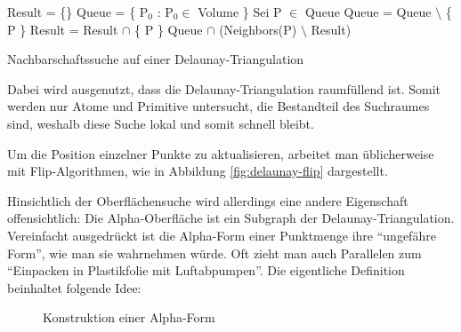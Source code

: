 \begin{algorithm}
  \centering
  \begin{algorithmic}
    \STATE Result = \{\}
    \STATE Queue = \{ P$_0$ : P$_0 \in$ Volume \}
    \STATE Sei P $\in$ Queue
    \STATE Queue = Queue $\setminus$ \{ P \}
    \STATE Result = Result $\cap$ \{ P \}
    \STATE Queue $\cap$ (Neighbors(P) $\setminus$ Result)
    \ENDIF
    \ENDWHILE
  \end{algorithmic}
  \caption[Nachbarschaftssuche auf einer Delaunay-Triangulation]{Nachbarschaftssuche auf einer Delaunay-Triangulation}
  \label{algo:delaunay-neighbors}
\end{algorithm}


Dabei wird ausgenutzt, dass die Delaunay-Triangulation raumfüllend ist.
Somit werden nur Atome und Primitive untersucht, die Bestandteil des Suchraumes sind, weshalb diese Suche lokal und somit schnell bleibt.

Um die Position einzelner Punkte zu aktualisieren, arbeitet man üblicherweise mit Flip-Algorithmen, wie in Abbildung \ref{fig:delaunay-flip} dargestellt.

Hinsichtlich der Oberflächensuche wird allerdings eine andere Eigenschaft offensichtlich:
Die Alpha-Oberfläche ist ein Subgraph der Delaunay-Triangulation.
Vereinfacht ausgedrückt ist die Alpha-Form einer Punktmenge ihre ``ungefähre Form'', wie man sie wahrnehmen würde.
Oft zieht man auch Parallelen zum ``Einpacken in Plastikfolie mit Luftabpumpen''.
Die eigentliche Definition beinhaltet folgende Idee:

\begin{figure}[bhpt]
  \centering
  \caption{Konstruktion einer Alpha-Form}
  \label{fig:delaunay-alpha}
\end{figure}

